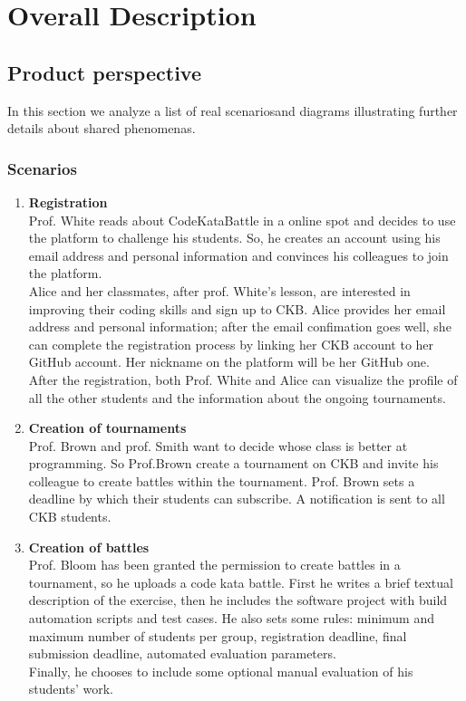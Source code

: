 \chapter{Overall Description}

\section{Product perspective}
In this section we analyze a list of real 
scenariosand diagrams illustrating further details about shared phenomenas.\\

\subsection{Scenarios}
\begin{enumerate}
    \item \textbf{Registration} \\
    Prof. White reads about CodeKataBattle in a online spot and decides to use the platform to 
    challenge his students. So, he creates an account using his email address and personal information 
    and convinces his colleagues to join the platform.\\
    Alice and her classmates, after prof. White's lesson, are interested in improving their coding 
    skills and sign up to CKB. Alice provides her email address and personal information; after the email 
    confimation goes well, 
    she can complete the registration process by linking her CKB account to her GitHub account. Her nickname 
    on the platform will be her GitHub one.\\
    After the registration, both Prof. White and Alice can visualize the profile of all the other 
    students and the information about the ongoing tournaments.

    \item \textbf{Creation of tournaments} \\
    Prof. Brown and prof. Smith want to decide whose class is better at programming. So Prof.Brown 
    create a tournament on CKB and invite his colleague to create battles within the tournament. Prof. Brown 
    sets a deadline by which their students can subscribe. A notification is sent to all CKB students. \\
    
    \item \textbf{Creation of battles} \\
    Prof. Bloom has been granted the permission to create battles in a tournament, so he uploads a 
    code kata battle. First he writes a brief textual description of the exercise, then he includes 
    the software project with build automation scripts and test cases. He also sets some rules: 
    minimum and maximum number of students per group, registration deadline, final submission deadline, 
    automated evaluation parameters.\\
    Finally, he chooses to include some optional manual evaluation of his students' work.\\


\end{enumerate}
